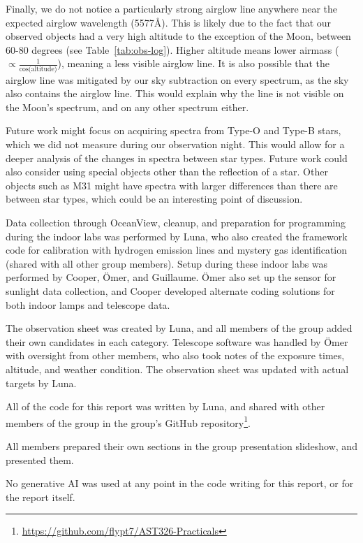 \documentclass[twocolumn]{aastex702}
\begin{document}
  		Finally, we do not notice a particularly strong airglow line anywhere near the expected airglow wavelength (5577Å). This is likely due to the fact that our observed objects had a very high altitude to the exception of the Moon, between 60-80 degrees (see Table~\ref{tab:obs-log}). Higher altitude means lower airmass ($\propto \frac{1}{\cos{\text{(altitude)}}}$), meaning a less visible airglow line. It is also possible that the airglow line was mitigated by our sky subtraction on every spectrum, as the sky also contains the airglow line. This would explain why the line is not visible on the Moon's spectrum, and on any other spectrum either.
  		
  		Future work might focus on acquiring spectra from Type-O and Type-B stars, which we did not measure during our observation night. This would allow for a deeper analysis of the changes in spectra between star types. Future work could also consider using special objects other than the reflection of a star. Other objects such as M31 might have spectra with larger differences than there are between star types, which could be an interesting point of discussion.

	\begin{contribution}
	
		Data collection through OceanView, cleanup, and preparation for programming during the indoor labs was performed by Luna, who also created the framework code for calibration with hydrogen emission lines and mystery gas identification (shared with all other group members). Setup during these indoor labs was performed by Cooper, Ömer, and Guillaume. Ömer also set up the sensor for sunlight data collection, and Cooper developed alternate coding solutions for both indoor lamps and telescope data. 
		
		The observation sheet was created by Luna, and all members of the group added their own candidates in each category. Telescope software was handled by Ömer with oversight from other members, who also took notes of the exposure times, altitude, and weather condition. The observation sheet was updated with actual targets by Luna.
		
		All of the code for this report was written by Luna, and shared with other members of the group in the group's GitHub repository\footnote{\href{https://github.com/flypt7/AST326-Practicals}{https://github.com/flypt7/AST326-Practicals}}.
		
		All members prepared their own sections in the group presentation slideshow, and presented them.
	
		No generative AI was used at any point in the code writing for this report, or for the report itself.
	\end{contribution}
	
\end{document}

